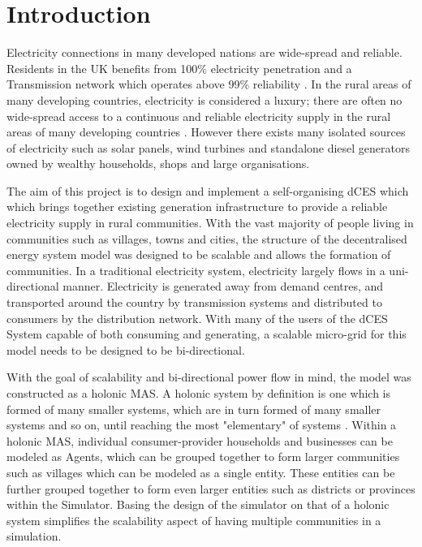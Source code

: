 \chapter{Introduction}
\label{introduction}

Electricity connections in many developed nations are wide-spread and reliable. Residents in the UK benefits from 100\% electricity penetration\cite{World-Bank-web:2015} and a Transmission network which operates above 99\% reliability \cite{NG-web:2015}. In the rural areas of many developing countries, electricity is considered a luxury; there are often no wide-spread access to a continuous and reliable electricity supply in the rural areas of many developing countries \cite{IEA-web:2015}. However there exists many isolated sources of electricity such as solar panels, wind turbines and standalone diesel generators owned by wealthy households, shops and large organisations. 

The aim of this project is to design and implement a self-organising \ac{dCES} which which brings together existing generation infrastructure to provide a reliable electricity supply in rural communities. With the vast majority of people living in communities such as villages, towns and cities, the structure of the decentralised energy system model was designed to be scalable and allows the formation of communities. In a traditional electricity system, electricity largely flows in a uni-directional manner. Electricity is generated away from demand centres, and transported around the country by transmission systems and distributed to consumers by the distribution network. With many of the users of the dCES System capable of both consuming and generating, a scalable micro-grid for this model needs to be designed to be bi-directional.

With the goal of scalability and bi-directional power flow in mind, the model was constructed as a holonic \ac{MAS}. A holonic system by definition is one which is formed of many smaller systems, which are in turn formed of many smaller systems and so on, until reaching the most "elementary" of systems \cite{Pitt:Holonic_Institutions}. Within a holonic MAS, individual consumer-provider households and businesses can be modeled as Agents, which can be grouped together to form larger communities such as villages which can be modeled as a single entity. These entities can be further grouped together to form even larger entities such as districts or provinces within the Simulator. Basing the design of the simulator on that of a holonic system simplifies the scalability aspect of having multiple communities in a simulation. 


